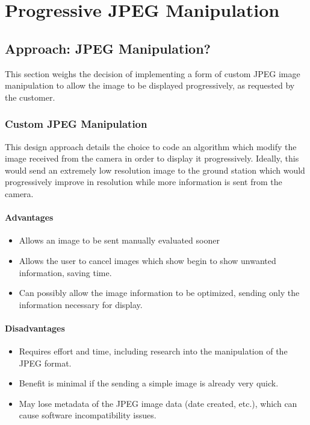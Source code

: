 \section{Progressive JPEG Manipulation}

\subsection{Approach: JPEG Manipulation?}

This section weighs the decision of implementing a form of custom JPEG image manipulation to 
allow the image to be displayed progressively, as requested by the customer.

\subsubsection*{Custom JPEG Manipulation}

This design approach details the choice to code an algorithm which 
modify the image received from the camera in order to display it progressively. 
Ideally, this would send an extremely low resolution image to the ground station which 
would progressively improve in resolution while more information is sent from the camera.

\paragraph*{Advantages}
\begin{itemize}
	\item Allows an image to be sent manually evaluated sooner
	\item Allows the user to cancel images which show begin to show unwanted information, saving time.
	\item Can possibly allow the image information to be optimized, sending only the information necessary for display.
\end{itemize}

\paragraph*{Disadvantages}
\begin{itemize}
	\item Requires effort and time, including research into the manipulation of the JPEG format.
	\item Benefit is minimal if the sending a simple image is already very quick.
	\item May lose metadata of the JPEG image data (date created, etc.), which can cause software incompatibility issues.
\end{itemize}

